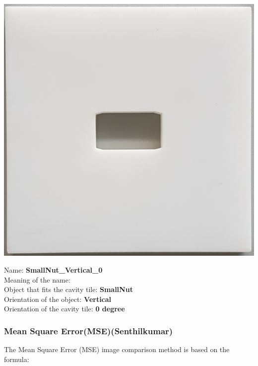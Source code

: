 \documentclass{article}
\begin{document}
\begin{minipage}[b]{0.35\linewidth}

\begin{center}
\includegraphics[height=5\baselineskip]{images/SmallNut_Vertical_00.jpg}
\end{center}

\end{minipage}
\begin{minipage}[b]{0.65\linewidth}
\begin{flushleft}
Name: \textbf{SmallNut\_Vertical\_0} \\ 
Meaning of the name: \\ 
Object that fits the cavity tile: \textbf{SmallNut} \\
Orientation of the object: \textbf{Vertical} \\
Orientation of the cavity tile:\textbf{ 0 degree}
\end{flushleft}

\end{minipage}



\subsubsection*{Mean Square Error(MSE)(Senthilkumar)}
 The Mean Square Error (MSE) image comparison method is based on the formula: \\
 
\end{document}
